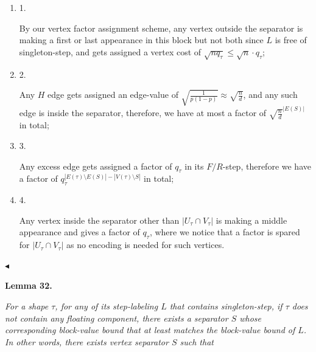 \begin{enumerate}


\item[] 
1. 


By our vertex factor assignment scheme, any vertex outside the separator is making a first or last appearance in this block but not both since $L$ is free of singleton-step, and gets assigned a vertex cost of $\sqrt{nq_{\tau}}\leq\sqrt{n}\cdot q_{\tau}$;\par





\item[] 
2. 


Any $H$ edge gets assigned an edge-value of $\sqrt{\frac{1}{p(1-p)}}\approx\sqrt{\frac{n}{d}}$, and any such edge is inside the separator, therefore, we have at most a factor of $\sqrt{\frac{n}{d}}^{|E(S)|}$ in total;\par





\item[] 
3. 


Any excess edge gets assigned a factor of $q_{\tau}$ in its $F/R$-step, therefore we have a factor of $q_{\tau}^{|E(\tau)\setminus E(S)|-|V(\tau)\setminus S|}$ in total;\par





\item[] 
4. 


Any vertex inside the separator other than $|U_{\tau}\cap V_{\tau}|$ is making a middle appearance and gives a factor of $q_{\tau}$, where we notice that a factor is spared for $|U_{\tau}\cap V_{\tau}|$ as no encoding is needed for such vertices.\par





\end{enumerate}


$\blacktriangleleft$\par





\par\medskip\noindent\textbf{
\textbf{Lemma 32}\textbf{.}
}\par



\emph{For a shape $\tau$, for any of its step-labeling $L$ that contains singleton-step, if $\tau$ does not contain any floating component, there exists a separator $S$ whose corresponding block-value bound that at least matches the block-value bound of $L$. In other words, there exists vertex separator $S$ such that}\par


